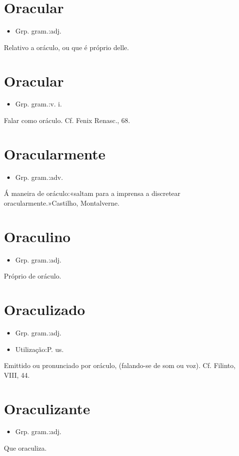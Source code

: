 \section{Oracular}
\begin{itemize}
\item {Grp. gram.:adj.}
\end{itemize}
Relativo a oráculo, ou que é próprio delle.
\section{Oracular}
\begin{itemize}
\item {Grp. gram.:v. i.}
\end{itemize}
Falar como oráculo. Cf. \textunderscore Fenix Renasc.\textunderscore , 68.
\section{Oracularmente}
\begin{itemize}
\item {Grp. gram.:adv.}
\end{itemize}
Á maneira de oráculo:«\textunderscore saltam para a imprensa a discretear oracularmente.\textunderscore »Castilho, \textunderscore Montalverne\textunderscore .
\section{Oraculino}
\begin{itemize}
\item {Grp. gram.:adj.}
\end{itemize}
Próprio de oráculo.
\section{Oraculizado}
\begin{itemize}
\item {Grp. gram.:adj.}
\end{itemize}
\begin{itemize}
\item {Utilização:P. us.}
\end{itemize}
Emittido ou pronunciado por oráculo, (falando-se de som ou voz). Cf. Filinto, VIII, 44.
\section{Oraculizante}
\begin{itemize}
\item {Grp. gram.:adj.}
\end{itemize}
Que oraculiza.
